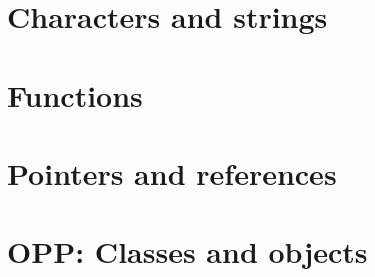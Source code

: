 \documentclass[openany]{book}
\begin{document}
\chapter{Characters and strings}


\chapter{Functions}
 

\chapter{Pointers and references}


\chapter{OPP: Classes and objects}


% 

% 

% 

% 

% 

% 

% 


\end{document}
